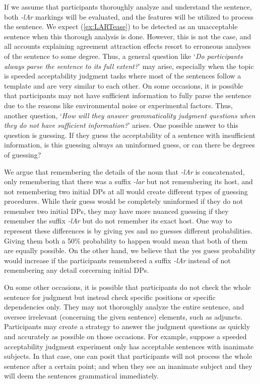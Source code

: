 If we assume that participants thoroughly analyze and understand the sentence, both \emph{-lAr} markings will be evaluated, and the features will be utilized to process the sentence. We expect (\ref{ex:LARTease}) to be detected as an unacceptable sentence when this thorough analysis is done. However, this is not the case, and all accounts explaining agreement attraction effects resort to erroneous analyses of the sentence to some degree. Thus, a general question like `\emph{Do participants always parse the sentence to its full extent?}' may arise, especially when the topic is speeded acceptability judgment tasks where most of the sentences follow a template and are very similar to each other. On some occasions, it is possible that participants may not have sufficient information to fully parse the sentence due to the reasons like environmental noise or experimental factors. Thus, another question, `\emph{How will they answer grammaticality judgment questions when they do not have sufficient information?}' arises. One possible answer to this question is guessing. If they guess the acceptability of a sentence with insufficient information, is this guessing always an uninformed guess, or can there be degrees of guessing? 

We argue that remembering the details of the noun that \emph{-lAr} is concatenated, only remembering that there was a suffix \emph{-lar} but not remembering its host, and not remembering two initial DPs at all would create different types of guessing procedures. While their guess would be completely uninformed if they do not remember two initial DPs, they may have more nuanced guessing if they remember the suffix \emph{-lAr} but do not remember its exact host. One way to represent these differences is by giving yes and no guesses different probabilities. Giving them both a 50\% probability to happen would mean that both of them are equally possible. On the other hand, we believe that the yes guess probability would increase if the participants remembered a suffix \emph{-lAr} instead of not remembering any detail corcerning initial DPs. 

On some other occasions, it is possible that participants do not check the whole sentence for judgment but instead check specific positions or specific dependencies only. They may not thoroughly analyze the entire sentence, and oversee irrelevant (concerning the given sentence) elements, such as adjuncts. Participants may create a strategy to answer the judgment questions as quickly and accurately as possible on those occasions. For example, suppose a speeded acceptability judgment experiment only has acceptable sentences with inanimate subjects. In that case, one can posit that participants will not process the whole sentence after a certain point; and when they see an inanimate subject and they will deem the sentences grammatical immediately. 

